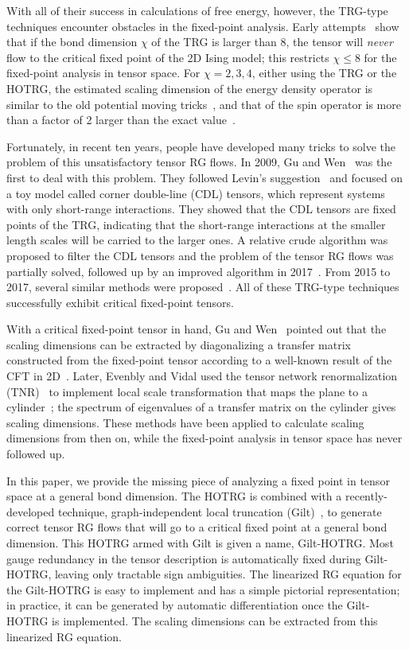 \documentclass[aps,prb,reprint,superscriptaddress,floatfix]{revtex4-2}
\begin{document}
With all of their success in calculations of free energy, however, the TRG-type techniques encounter obstacles in the fixed-point analysis. 
Early attempts~\cite{Berker2008,aoki2009,meurice2013,kadanoff2014} show that if the bond dimension $\chi$ of the TRG is larger than 8, the tensor will \textit{never} flow to the critical fixed point of the 2D Ising model; this restricts $\chi \leq 8$ for the fixed-point analysis in tensor space.
For $\chi = 2, 3, 4$, either using the TRG or the HOTRG, the estimated scaling dimension of the energy density operator is similar to the old potential moving tricks~\cite{Berker2008,aoki2009,meurice2013}, and that of the spin operator is more than a factor of 2 larger than the exact value~\cite{kadanoff2014}. 
%

Fortunately, in recent ten years, people have developed many tricks to solve the problem of this unsatisfactory tensor RG flows.
In 2009, Gu and Wen~\cite{GuWen2009} was the first to deal with this problem. 
They followed Levin's suggestion~\cite{trg,LevinTalk} and focused on a toy model called corner double-line (CDL) tensors, which represent systems with only short-range interactions. 
They showed that the CDL tensors are fixed points of the TRG, indicating that the short-range interactions at the smaller length scales will be carried to the larger ones. 
A relative crude algorithm was proposed to filter the CDL tensors and the problem of the tensor RG flows was partially solved, followed up by an improved algorithm in 2017~\cite{looptnr}. 
From 2015 to 2017, several similar methods were proposed~\cite{tnr,tnralgo,tnrplus}. 
All of these TRG-type techniques successfully exhibit critical fixed-point tensors. 
%

With a critical fixed-point tensor in hand, Gu and Wen~\cite{GuWen2009} pointed out that the scaling dimensions can be extracted by diagonalizing a transfer matrix constructed from the fixed-point tensor according to a well-known result of the CFT in 2D~\cite{cardy1986}. 
Later, Evenbly and Vidal used the tensor network renormalization (TNR)~\cite{tnr,tnralgo} to implement local scale transformation that maps the plane to a cylinder~\cite{EvenblyDilatationOp}; the spectrum of eigenvalues of a transfer matrix on the cylinder gives scaling dimensions.
These methods have been applied to calculate scaling dimensions from then on, while the fixed-point analysis in tensor space has never followed up.
%

In this paper, we provide the missing piece of analyzing a fixed point in tensor space at a general bond dimension.
The HOTRG is combined with a recently-developed technique, graph-independent local truncation (Gilt)~\cite{gilts}, to generate correct tensor RG flows that will go to a critical fixed point at a general bond dimension. 
This HOTRG armed with Gilt is given a name, Gilt-HOTRG\@. 
Most gauge redundancy in the tensor description is automatically fixed during Gilt-HOTRG, leaving only tractable sign ambiguities.
The linearized RG equation for the Gilt-HOTRG is easy to implement and has a simple pictorial representation; in practice, it can be generated by automatic differentiation once the Gilt-HOTRG is implemented.
The scaling dimensions can be extracted from this linearized RG equation.
%
\end{document}
